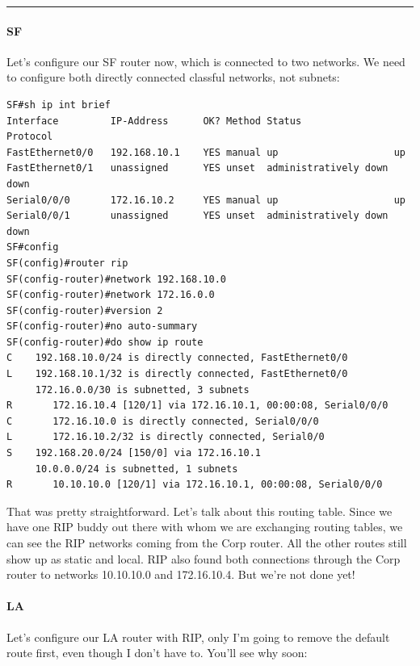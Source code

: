 \begin{center}\rule{0.5\linewidth}{0.5pt}\end{center}

\paragraph{SF}

Let's configure our SF router now, which is connected to two networks.
We need to configure both directly connected classful networks, not
subnets:

\begin{verbatim}
SF#sh ip int brief
Interface         IP-Address      OK? Method Status             Protocol
FastEthernet0/0   192.168.10.1    YES manual up                    up
FastEthernet0/1   unassigned      YES unset  administratively down down
Serial0/0/0       172.16.10.2     YES manual up                    up
Serial0/0/1       unassigned      YES unset  administratively down down
SF#config
SF(config)#router rip
SF(config-router)#network 192.168.10.0
SF(config-router)#network 172.16.0.0
SF(config-router)#version 2
SF(config-router)#no auto-summary
SF(config-router)#do show ip route
C    192.168.10.0/24 is directly connected, FastEthernet0/0
L    192.168.10.1/32 is directly connected, FastEthernet0/0
     172.16.0.0/30 is subnetted, 3 subnets
R       172.16.10.4 [120/1] via 172.16.10.1, 00:00:08, Serial0/0/0
C       172.16.10.0 is directly connected, Serial0/0/0
L       172.16.10.2/32 is directly connected, Serial0/0
S    192.168.20.0/24 [150/0] via 172.16.10.1
     10.0.0.0/24 is subnetted, 1 subnets
R       10.10.10.0 [120/1] via 172.16.10.1, 00:00:08, Serial0/0/0
\end{verbatim}

That was pretty straightforward. Let's talk about this routing table.
Since we have one RIP buddy out there with whom we are exchanging
routing tables, we can see the RIP networks coming from the Corp router.
All the other routes still show up as static and local. RIP also found
both connections through the Corp router to networks 10.10.10.0 and
172.16.10.4. But we're not done yet!

\paragraph{LA}

Let's configure our LA router with RIP, only I'm going to remove the
default route first, even though I don't have to. You'll see why soon:

